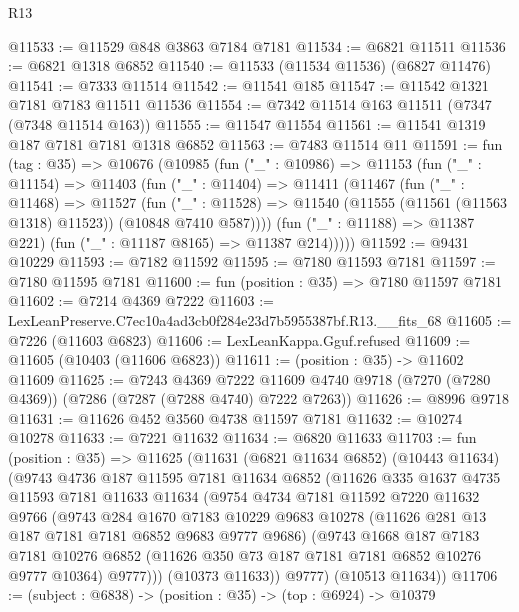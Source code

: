 \begin{lexlean}{R13}
\begin{coremodule}
@11533 := @11529 @848 @3863 @7184 @7181
@11534 := @6821 @11511
@11536 := @6821 @1318 @6852
@11540 := @11533 (@11534 @11536) (@6827 @11476)
@11541 := @7333 @11514
@11542 := @11541 @185
@11547 := @11542 @1321 @7181 @7183 @11511 @11536
@11554 := @7342 @11514 @163 @11511 (@7347 (@7348 @11514 @163))
@11555 := @11547 @11554
@11561 := @11541 @1319 @187 @7181 @7181 @1318 @6852
@11563 := @7483 @11514 @11
@11591 := fun (tag : @35) =>
  @10676
    (@10985
      (fun ("_" : @10986) =>
      @11153
        (fun ("_" : @11154) =>
        @11403
          (fun ("_" : @11404) =>
          @11411
            (@11467
              (fun ("_" : @11468) =>
              @11527
                (fun ("_" : @11528) =>
                @11540 (@11555 (@11561 (@11563 @1318) @11523)) (@10848 @7410 @587))))
            (fun ("_" : @11188) => @11387 @221)
            (fun ("_" : @11187 @8165) => @11387 @214)))))
@11592 := @9431 @10229
@11593 := @7182 @11592
@11595 := @7180 @11593 @7181
@11597 := @7180 @11595 @7181
@11600 := fun (position : @35) => @7180 @11597 @7181
@11602 := @7214 @4369 @7222
@11603 := LexLeanPreserve.C7ec10a4ad3cb0f284e23d7b5955387bf.R13.__fits_68
@11605 := @7226 (@11603 @6823)
@11606 := LexLeanKappa.Gguf.refused
@11609 := @11605 (@10403 (@11606 @6823))
@11611 := (position : @35) -> @11602 @11609
@11625 := @7243
    @4369
    @7222
    @11609
    @4740
    @9718
    (@7270 (@7280 @4369))
    (@7286 (@7287 (@7288 @4740) @7222 @7263))
@11626 := @8996 @9718
@11631 := @11626 @452 @3560 @4738 @11597 @7181
@11632 := @10274 @10278
@11633 := @7221 @11632
@11634 := @6820 @11633
@11703 := fun (position : @35) =>
  @11625
    (@11631
      (@6821 @11634 @6852)
      (@10443 @11634)
      (@9743
        @4736
        @187
        @11595
        @7181
        @11634
        @6852
        (@11626
          @335
          @1637
          @4735
          @11593
          @7181
          @11633
          @11634
          (@9754
            @4734
            @7181
            @11592
            @7220
            @11632
            @9766
            (@9743
              @284
              @1670
              @7183
              @10229
              @9683
              @10278
              (@11626 @281 @13 @187 @7181 @7181 @6852 @9683 @9777 @9686)
              (@9743
                @1668
                @187
                @7183
                @7181
                @10276
                @6852
                (@11626 @350 @73 @187 @7181 @7181 @6852 @10276 @9777 @10364)
                @9777)))
          (@10373 @11633))
        @9777)
      (@10513 @11634))
@11706 := (subject : @6838) -> (position : @35) -> (top : @6924) -> @10379

\end{coremodule}
\end{lexlean}
